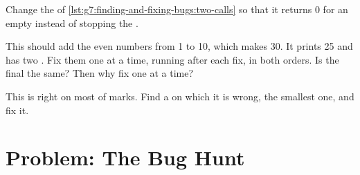 \begin{exercise}[$\star\star\star$]\label{exo:g7:finding-and-fixing-bugs:10}
Change the   of \cref{lst:g7:finding-and-fixing-bugs:two-calls}
so that it returns 0 for an empty  instead of stopping the .
\end{exercise}

\begin{exercise}[$\star\star\star$]\label{exo:g7:finding-and-fixing-bugs:11}
This  should add the even numbers from 1 to 10, which makes 30. It
prints 25 and has two . Fix them one at a time, running after each fix,
in both orders. Is the final  the same? Then why fix one at a time?

\label{lst:g7:finding-and-fixing-bugs:evens}
\end{exercise}

\begin{exercise}[$\star\star\star$]\label{exo:g7:finding-and-fixing-bugs:12}
This  is right on most  of marks. Find a  on which it is
wrong, the smallest one, and fix it.

\label{lst:g7:finding-and-fixing-bugs:largest}
\end{exercise}

\section{Problem: The Bug Hunt}

